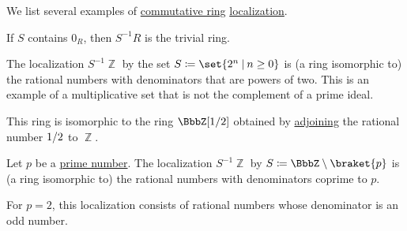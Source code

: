 \begin{example}\label{ex:def:ring_localization}
  We list several examples of \hyperref[def:ring/commutative]{commutative ring} \hyperref[def:ring_localization]{localization}.

  \begin{thmenum}
     If \( S \) contains \( 0_R \), then \( S^{-1} R \) is the trivial ring.

     The localization \( S^{-1} \BbbZ \) by the set \( S \coloneqq \set{ 2^n \given n \geq 0 } \) is (a ring isomorphic to) the rational numbers with denominators that are powers of two. This is an example of a multiplicative set that is not the complement of a prime ideal.

    This ring is isomorphic to the ring \( \BbbZ[\ifrac 1 2] \) obtained by \hyperref[thm:adjoining_elements_to_semiring]{adjoining} the rational number \( 1 / 2 \) to \( \BbbZ \).

     Let \( p \) be a \hyperref[def:prime_number]{prime number}. The localization \( S^{-1} \BbbZ \) by \( S \coloneqq \BbbZ \setminus \braket{ p } \) is (a ring isomorphic to) the rational numbers with denominators coprime to \( p \).

    For \( p = 2 \), this localization consists of rational numbers whose denominator is an odd number.
  \end{thmenum}
\end{example}

